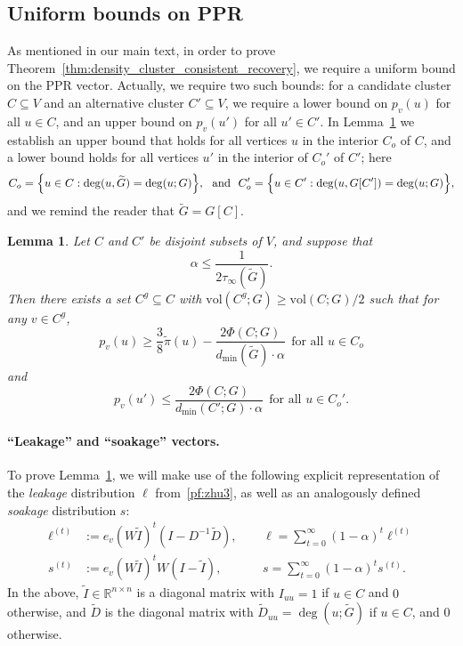 \documentclass{article}
\newcommand{\Reals}{\mathbb{R}}
\newcommand{\vol}{\mathrm{vol}}
\newcommand{\1}{\mathbf{1}}
\newcommand{\wt}[1]{\widetilde{#1}}
\newtheorem{lemma}{Lemma}[section]
\theoremstyle{definition}
\theoremstyle{remark}
\begin{document}
\subsection{Uniform bounds on PPR}
\label{subsec:ppr_uniform_bounds}
As mentioned in our main text, in order to prove Theorem~\ref{thm:density_cluster_consistent_recovery}, we require a uniform bound on the PPR vector. Actually, we require two such bounds: for a candidate cluster $C \subseteq V$ and an alternative cluster $C' \subseteq V$, we require a lower bound on $p_v(u)$ for all $u \in C$, and an upper bound on $p_v(u')$ for all $u' \in C'$. In Lemma~\ref{lem:ppr_uniform_bound} we establish an upper bound that holds for all vertices $u$ in the interior $C_{o}$ of $C$, and a lower bound holds for all vertices $u'$ in the interior of $C_{o}'$ of $C'$; here
\begin{equation*}
C_{o} = \Bigl\{u \in C: \deg(u,\wt{G}) =  \deg(u;G)\Bigr\},~~\textrm{and}~~C_{o}'= \Bigl\{u \in C': \deg(u,G[C']) =  \deg(u;G)\Bigr\},
\end{equation*}
and we remind the reader that $\wt{G} = G[C]$. 
\begin{lemma}
	\label{lem:ppr_uniform_bound}
	Let $C$ and $C'$ be disjoint subsets of $V$, and suppose that
	\begin{equation*}
	\alpha \leq \frac{1}{2\tau_{\infty}(\wt{G})}.
	\end{equation*}
	Then there exists a set $C^g \subseteq C$ with $\vol(C^g;G) \geq \vol(C;G)/2$ such that for any $v \in C^g$,
	\begin{equation}
	\label{eqn:ppr_uniform_bound_C}
	p_v(u) \geq \frac{3}{8}\wt{\pi}(u) - \frac{2 \Phi(C;G)}{d_{\min}(\wt{G})\cdot \alpha}~~\textrm{for all $u \in C_{o}$}
	\end{equation}
	and
	\begin{equation}
	\label{eqn:ppr_uniform_bound_Cprime}
	p_v(u') \leq \frac{2\Phi(C;G)}{d_{\min}(C';G) \cdot \alpha}~~\textrm{for all $u \in C_{o}'$.}
	\end{equation}
\end{lemma}

\paragraph{``Leakage'' and ``soakage'' vectors.} To prove Lemma~\ref{lem:ppr_uniform_bound}, we will make use of the following explicit representation of the \emph{leakage} distribution $\ell$ from~\eqref{pf:zhu3}, as well as an analogously defined \emph{soakage} distribution $s$:
\begin{equation}
\label{eqn:leakage_soakage}
\begin{aligned}
\ell^{(t)} & := e_v(W \wt{I})^t(I - D^{-1}\wt{D}),~~&& \ell = \sum_{t = 0}^{\infty} (1 - \alpha)^t \ell^{(t)} \\
s^{(t)} & := e_v(W \wt{I})^t W (I - \wt{I}),~~&& s = \sum_{t = 0}^{\infty} (1 - \alpha)^t s^{(t)}.
\end{aligned}
\end{equation}
In the above, $\wt{I} \in \Reals^{n \times n}$ is a diagonal matrix with $I_{uu} = 1$ if $u \in C$ and $0$ otherwise, and $\wt{D}$ is the diagonal matrix with $\wt{D}_{uu} = \deg(u;\wt{G})$ if $u \in C$, and $0$ otherwise. 
\end{document}
